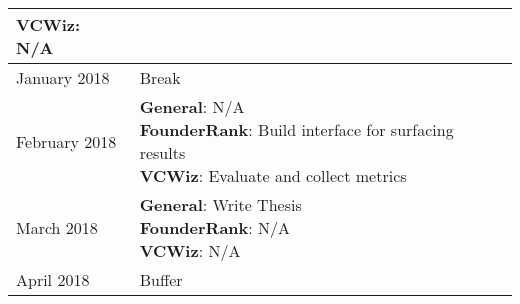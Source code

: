 \begin{table}[ht]
\begin{tabular}{|l|l|}
{                    \textbf{VCWiz}: N/A \\
                  } \\\hline
  January 2018 & Break \\\hline
  February 2018 & \makecell{
                    \textbf{General}: N/A \\
                    \textbf{FounderRank}: Build interface for surfacing results \\
                    \textbf{VCWiz}: Evaluate and collect metrics \\
                  } \\\hline
  March 2018 & \makecell{
                    \textbf{General}: Write Thesis \\
                    \textbf{FounderRank}: N/A \\
                    \textbf{VCWiz}: N/A \\
                  } \\\hline
  April 2018 & Buffer \\\hline
\end{tabular}
\end{table}
